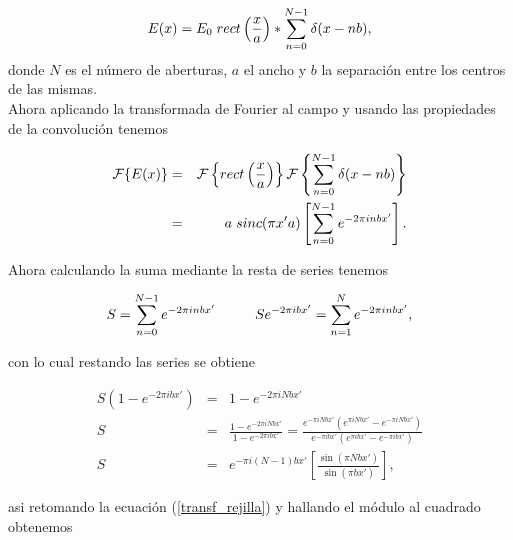 \begin{equation}\label{campo_rejilla}
    E(x)=E_0 \hspace{1mm} rect\left(\frac{x}{a}\right) \ast \sum_{n=0}^{N-1}\delta(x-nb) ,
\end{equation}
donde $N$ es el número de aberturas, $a$ el ancho y $b$ la separación entre los centros de las mismas.\\
Ahora aplicando la transformada de Fourier al campo y usando las propiedades de la convolución tenemos

\begin{eqnarray}\label{transf_rejilla}
    \mathcal{F}\lbrace E(x)\rbrace&=&\mathcal{F}\left \{ rect\left(\frac{x}{a}\right)\right \}\mathcal{F}\left \{ \sum_{n=0}^{N-1}\delta(x-nb)\right \}\\
    &=& a\hspace{1mm}sinc(\pi x' a) \left[ \sum_{n=0}^{N-1} e^{-2\pi i nbx'} \right].
\end{eqnarray}

Ahora calculando la suma mediante la resta de series tenemos

\begin{equation}
    S=\sum_{n=0}^{N-1} e^{-2\pi i nbx'} \hspace{10mm}S e^{-2\pi i bx'} = \sum_{n=1}^{N} e^{-2\pi i nbx'},
\end{equation}

con lo cual restando las series se obtiene

\begin{eqnarray}
    S\left(1-e^{-2\pi i bx'}\right)&=&1-e^{-2\pi i Nbx'}\\
    S&=&\frac{1-e^{-2\pi i Nbx'}}{1-e^{-2\pi i bx'}}=\frac{e^{-\pi i Nbx'}\left(e^{\pi i Nbx'}-e^{-\pi i Nbx'}\right)}{e^{-\pi i bx'}\left(e^{\pi i bx'}-e^{-\pi i bx'}\right)}\\
    S&=&e^{-\pi i (N-1) bx'}\left[\frac{\sin{(\pi N bx')}}{\sin{(\pi  bx')}}\right],
\end{eqnarray}

asi retomando la ecuación (\ref{transf_rejilla}) y hallando el módulo al cuadrado obtenemos 

